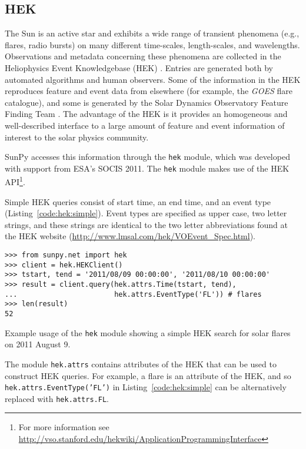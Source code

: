 \subsection{HEK}\label{ssec:hek}

The Sun is an active star and exhibits a wide range of transient phenomena 
(e.g., flares, radio bursts) on many different time-scales, length-scales, and 
wavelengths. Observations and metadata concerning these phenomena are collected 
in the Heliophysics Event Knowledgebase (HEK) \citep{hek2012}.  Entries are generated both by 
automated algorithms and human observers.  Some of the information in the HEK 
reproduces feature and event data from elsewhere (for example, the \textit{GOES} flare catalogue),
and some is generated by the Solar Dynamics Observatory Feature Finding Team 
\citep{martens2012}.  The advantage of the HEK is it 
provides an homogeneous and well-described interface to a large amount of 
feature and event information of interest to the solar physics community.

SunPy accesses this information through the \texttt{hek} module, which was
developed with support from ESA's SOCIS 2011.  The \texttt{hek} module makes 
use of the 
HEK API\footnote{For more information see 
\href{http://vso.stanford.edu/hekwiki/ApplicationProgrammingInterface}{http://vso.stanford.edu/hekwiki/ApplicationProgrammingInterface}}.

Simple HEK queries consist of start time, an end time, and an event type 
(Listing~\ref{code:hek:simple}). Event types are specified as upper case, 
two letter strings, and these strings are 
identical to the two letter abbreviations found at the HEK website
(\url{http://www.lmsal.com/hek/VOEvent_Spec.html}).

\begin{listing}[H]
\begin{verbatim}
>>> from sunpy.net import hek
>>> client = hek.HEKClient()
>>> tstart, tend = '2011/08/09 00:00:00', '2011/08/10 00:00:00'
>>> result = client.query(hek.attrs.Time(tstart, tend), 
...                       hek.attrs.EventType('FL')) # flares
>>> len(result)
52
\end{verbatim}
\caption{Example usage of the \texttt{hek} module showing a simple HEK search for solar flares
on 2011 August 9.}
\label{code:hek:simple}
\end{listing}

The module \texttt{hek.attrs} contains attributes of the HEK that can be used to
construct HEK queries.  For example, a flare is an attribute of the HEK,
 and so 
\texttt{hek.attrs.EventType('FL')} in Listing~\ref{code:hek:simple}
can be alternatively replaced with \texttt{hek.attrs.FL}. 

